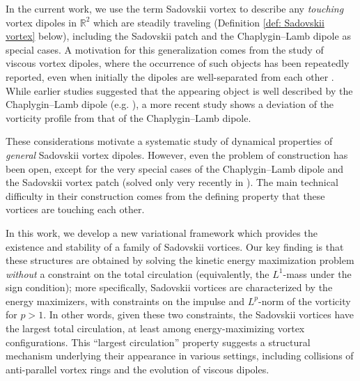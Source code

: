 \documentclass[11pt]{amsart}
\theoremstyle{definition}
\theoremstyle{definition}
\numberwithin{equation}{section}
\newcommand{\0}{\emptyset}
\newcommand{\bbR}{\mathbb R}
\begin{document}
	In the current work, we use the term Sadovskii vortex to describe any \textit{touching} vortex dipoles in $\bbR^{2}$ which are steadily traveling (Definition \ref{def: Sadovskii vortex} below), including the Sadovskii patch and the Chaplygin--Lamb dipole \cite{Cha1903,Lamb1906} as special cases. A motivation for this generalization comes from the study of viscous vortex dipoles, where the occurrence of such objects has been repeatedly reported, even when initially the dipoles are well-separated from each other \cite{MV1994,Nielsen,Trieling,Sipp,DeRo2009,DoGa}. While earlier studies suggested that the appearing object is well described by the Chaplygin--Lamb dipole (e.g. \cite{Nielsen,Sipp}), a more recent study \cite{DeRo2009} shows a deviation of the vorticity profile from that of the Chaplygin--Lamb dipole. 
	
	
	
	These considerations motivate a systematic study of dynamical properties of \textit{general} Sadovskii vortex dipoles. However, even the problem of construction has been open, except for the very special cases of the Chaplygin--Lamb dipole and the Sadovskii vortex patch (solved only very recently in \cite{CJS2025,HT2025}). The main technical difficulty in their construction comes from the defining property that these vortices are touching each other. 
	
	In this work, we develop a new variational framework which provides the existence and stability of a family of Sadovskii vortices. Our key finding is that these structures are obtained by solving the kinetic energy maximization problem \textit{without} a constraint on the total circulation (equivalently, the $L^1$-mass under the sign condition); more specifically, Sadovskii vortices are characterized by the energy maximizers, with constraints on the impulse and $L^p$-norm of the vorticity for $p>1$. In other words, given these two constraints, the Sadovskii vortices have the largest total circulation, at least among energy-maximizing vortex configurations. 
    This ``largest circulation'' property suggests a structural mechanism underlying their appearance in various settings, including collisions of anti-parallel vortex rings and the evolution of viscous dipoles.
\end{document}
